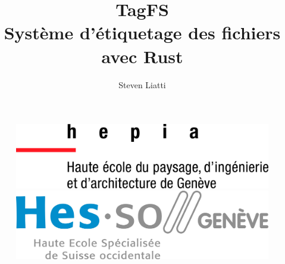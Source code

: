 \documentclass[a4paper, 12pt]{article}
\begin{document}
\title{TagFS \protect\\ Système d'étiquetage des fichiers avec Rust}
\author{Steven Liatti}
\maketitle



\begin{figure}[!b]
	\centering
	\begin{minipage}{.5\textwidth}
		\centering
		\includegraphics[width=.7\linewidth]{images/hepia.jpg}
	\end{minipage}%
	\begin{minipage}{.5\textwidth}
		\centering
		\includegraphics[width=.7\linewidth]{images/hesso.jpg}
	\end{minipage}
\end{figure}
\newpage


\newpage
\end{document}
